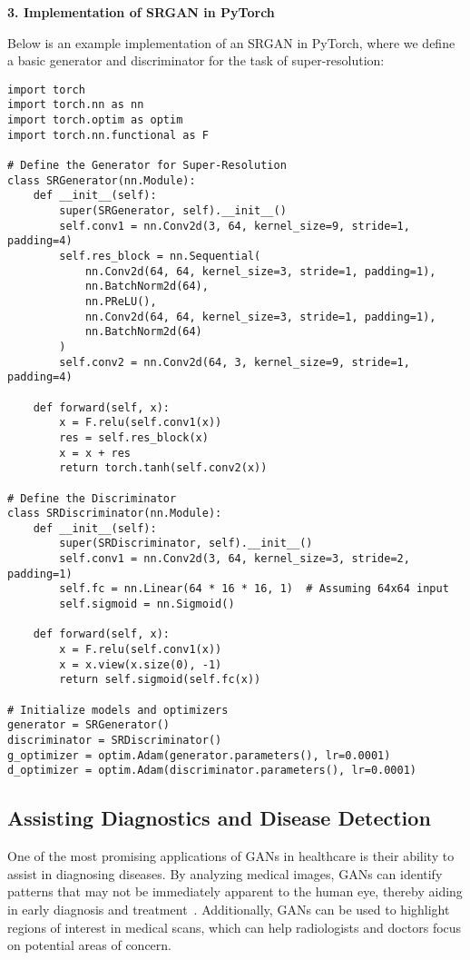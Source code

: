 \textbf{3. Implementation of SRGAN in PyTorch}

Below is an example implementation of an SRGAN in PyTorch, where we define a basic generator and discriminator for the task of super-resolution:

\begin{lstlisting}[style=python]
import torch
import torch.nn as nn
import torch.optim as optim
import torch.nn.functional as F

# Define the Generator for Super-Resolution
class SRGenerator(nn.Module):
    def __init__(self):
        super(SRGenerator, self).__init__()
        self.conv1 = nn.Conv2d(3, 64, kernel_size=9, stride=1, padding=4)
        self.res_block = nn.Sequential(
            nn.Conv2d(64, 64, kernel_size=3, stride=1, padding=1),
            nn.BatchNorm2d(64),
            nn.PReLU(),
            nn.Conv2d(64, 64, kernel_size=3, stride=1, padding=1),
            nn.BatchNorm2d(64)
        )
        self.conv2 = nn.Conv2d(64, 3, kernel_size=9, stride=1, padding=4)
    
    def forward(self, x):
        x = F.relu(self.conv1(x))
        res = self.res_block(x)
        x = x + res
        return torch.tanh(self.conv2(x))

# Define the Discriminator
class SRDiscriminator(nn.Module):
    def __init__(self):
        super(SRDiscriminator, self).__init__()
        self.conv1 = nn.Conv2d(3, 64, kernel_size=3, stride=2, padding=1)
        self.fc = nn.Linear(64 * 16 * 16, 1)  # Assuming 64x64 input
        self.sigmoid = nn.Sigmoid()
    
    def forward(self, x):
        x = F.relu(self.conv1(x))
        x = x.view(x.size(0), -1)
        return self.sigmoid(self.fc(x))

# Initialize models and optimizers
generator = SRGenerator()
discriminator = SRDiscriminator()
g_optimizer = optim.Adam(generator.parameters(), lr=0.0001)
d_optimizer = optim.Adam(discriminator.parameters(), lr=0.0001)
\end{lstlisting}

\subsection{Assisting Diagnostics and Disease Detection}

One of the most promising applications of GANs in healthcare is their ability to assist in diagnosing diseases. By analyzing medical images, GANs can identify patterns that may not be immediately apparent to the human eye, thereby aiding in early diagnosis and treatment~\cite{bai2022novel}. Additionally, GANs can be used to highlight regions of interest in medical scans, which can help radiologists and doctors focus on potential areas of concern.

